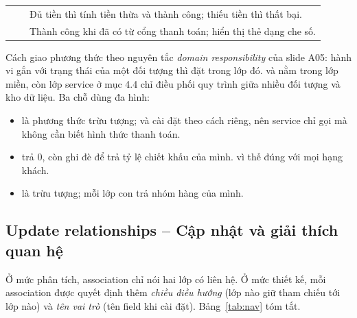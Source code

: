 \documentclass[12pt,a4paper]{article}
\begin{document}
\begin{longtable}{@{}P{2.4cm}P{6.6cm}P{6.9cm}@{}}
\small{} & \small{} & \small Đủ tiền thì tính tiền thừa và thành công; thiếu tiền thì thất bại.\\
\small{} & \small{}\newline{} & \small Thành công khi đã có  từ cổng thanh toán; hiển thị thẻ dạng che số.\\
\bottomrule
\end{longtable}

Cách giao phương thức theo nguyên tắc \emph{domain responsibility} của slide A05: hành vi gắn với trạng
thái của một đối tượng thì đặt trong lớp đó.  và  nằm
trong lớp miền, còn lớp service ở mục 4.4 chỉ điều phối quy trình giữa nhiều đối tượng và kho dữ liệu.
Ba chỗ dùng đa hình:
\begin{itemize}
\item {} là phương thức trừu tượng;  và  cài đặt theo
cách riêng, nên service chỉ gọi  mà không cần biết hình thức thanh toán.
\item {} trả 0, còn  ghi đè để trả tỷ lệ chiết khấu của
mình.  vì thế đúng với mọi hạng khách.
\item {} là trừu tượng; mỗi lớp con trả nhóm hàng của mình.
\end{itemize}

\subsection{Update relationships -- Cập nhật và giải thích quan hệ}

Ở mức phân tích, association chỉ nói hai lớp có liên hệ. Ở mức thiết kế, mỗi association được quyết định
thêm \emph{chiều điều hướng} (lớp nào giữ tham chiếu tới lớp nào) và \emph{tên vai trò} (tên field khi cài
đặt). Bảng~\ref{tab:nav} tóm tắt.
\end{document}
